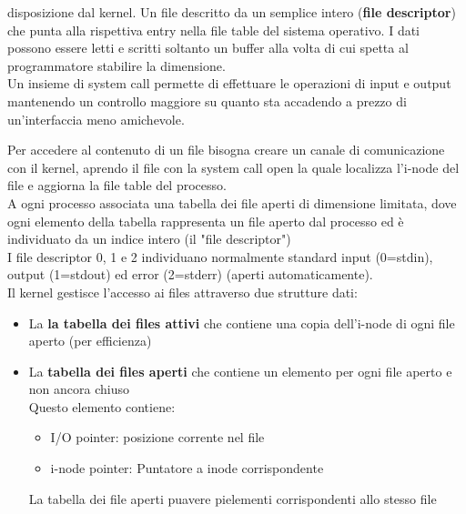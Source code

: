 \begin{flushleft}
\begin{itemize}
            disposizione dal kernel. Un file \ace descritto da un semplice intero (\textbf{file descriptor}) che punta alla rispettiva 
            entry nella file table del sistema operativo. I dati possono essere letti e scritti 
            soltanto un buffer alla volta di cui spetta al programmatore stabilire la dimensione.\\
            Un insieme di system call permette di effettuare le operazioni di input e output 
            mantenendo un controllo maggiore su quanto sta accadendo a prezzo di 
            un'interfaccia meno amichevole.\par 
            Per accedere al contenuto di un file bisogna creare un canale di comunicazione con il 
            kernel, aprendo il file con la system call open la quale localizza l’i-node del file e 
            aggiorna la file table del processo.\\
            A ogni processo \ace associata una tabella dei file aperti 
            di dimensione limitata, dove ogni elemento della 
            tabella rappresenta un file aperto dal processo ed è 
            individuato da un indice intero (il "file descriptor")\\
            I file descriptor 0, 1 e 2 individuano normalmente 
            standard input (0=stdin), output (1=stdout) ed error (2=stderr) (aperti automaticamente). \\
            Il kernel gestisce l'accesso ai files attraverso due strutture dati: 
            \begin{itemize}
              \item La \textbf{la tabella dei files attivi} che contiene una copia dell'i-node di ogni file 
                    aperto (per efficienza)
              \item La \textbf{tabella dei files aperti} che contiene un elemento per ogni file aperto e 
                    non ancora chiuso\\ Questo elemento contiene:
                      \begin{itemize}
                        \item I/O pointer: posizione corrente nel file
                        \item i-node pointer: Puntatore a inode corrispondente
                      \end{itemize}
                    La tabella dei file aperti pu\aco avere pi\acu elementi corrispondenti allo stesso file
            \end{itemize} 

\end{itemize}
\end{flushleft}
